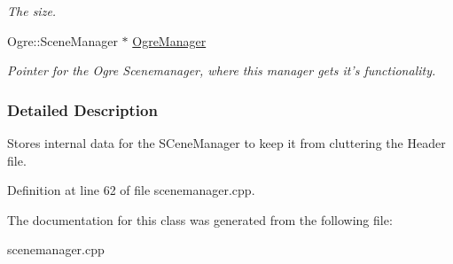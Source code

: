 \begin{DoxyCompactItemize}
\begin{DoxyCompactList}\small\item\em The size. \item\end{DoxyCompactList}\item 
\hypertarget{classphys_1_1internal_1_1SceneManagerData_a685cc93f5a9070ae7d78f6eaa62db00a}{
Ogre::SceneManager $\ast$ \hyperlink{classphys_1_1internal_1_1SceneManagerData_a685cc93f5a9070ae7d78f6eaa62db00a}{OgreManager}}
\label{classphys_1_1internal_1_1SceneManagerData_a685cc93f5a9070ae7d78f6eaa62db00a}

\begin{DoxyCompactList}\small\item\em Pointer for the Ogre Scenemanager, where this manager gets it's functionality. \item\end{DoxyCompactList}\end{DoxyCompactItemize}


\subsubsection{Detailed Description}
Stores internal data for the SCeneManager to keep it from cluttering the Header file. 

Definition at line 62 of file scenemanager.cpp.



The documentation for this class was generated from the following file:\begin{DoxyCompactItemize}
\item 
scenemanager.cpp\end{DoxyCompactItemize}
